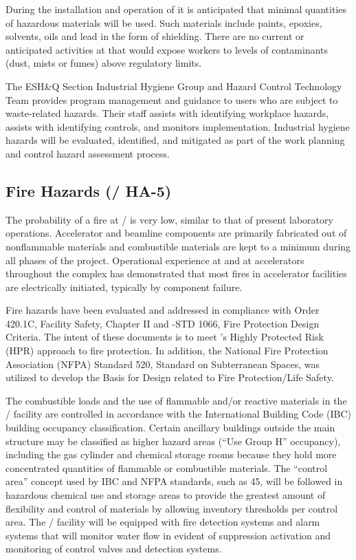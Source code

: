 During the installation and operation of  it is anticipated that
minimal quantities of hazardous materials will be used. Such materials
include paints, epoxies, solvents, oils and lead in the form of
shielding. There are no current or anticipated activities at  that
would expose workers to levels of contaminants (dust, mists or fumes)
above regulatory limits.

The ESH\&Q Section Industrial Hygiene Group and Hazard Control
Technology Team provides program management and guidance to users who
are subject to waste-related hazards.  Their staff assists with
identifying workplace hazards, assists with identifying controls, and
monitors implementation. Industrial hygiene hazards will be evaluated,
identified, and mitigated as part of the work planning and control
hazard assessment process.

\subsection{Fire Hazards (/ HA-5)}

The probability of a fire at / is very low, similar to that of
present laboratory operations. Accelerator and beamline components are
primarily fabricated out of nonflammable materials and combustible
materials are kept to a minimum during all phases of the
project. Operational experience at \fnal and at accelerators
throughout the  complex has demonstrated that most fires in
accelerator facilities are electrically initiated, typically by
component failure.

Fire hazards have been evaluated and addressed in compliance with 
Order 420.1C, Facility Safety, Chapter II and -STD 1066, Fire
Protection Design Criteria.  The intent of these documents is to meet
's Highly Protected Risk (HPR) approach to fire protection.  In
addition, the National Fire Protection Association (NFPA) Standard
520, Standard on Subterranean Spaces, was utilized to develop the
Basis for Design related to Fire Protection/Life Safety.

The combustible loads and the use of flammable and/or reactive
materials in the / facility are controlled in accordance with
the International Building Code (IBC) building occupancy
classification. Certain ancillary buildings outside the main structure
may be classified as higher hazard areas (``Use Group H'' occupancy),
including the gas cylinder and chemical storage rooms because they
hold more concentrated quantities of flammable or combustible
materials.  The ``control area'' concept used by IBC and NFPA standards,
such as 45, will be followed in hazardous chemical use and storage
areas to provide the greatest amount of flexibility and control of
materials by allowing inventory thresholds per control area.  The
/ facility will be equipped with fire detection systems and
alarm systems that will monitor water flow in evident of suppression
activation and monitoring of control valves and detection systems.

